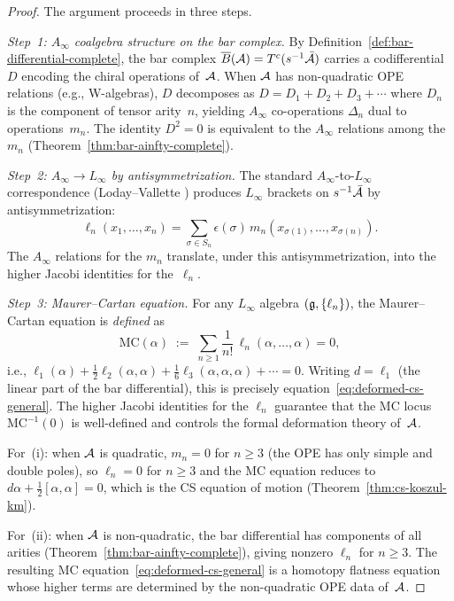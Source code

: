 \begin{proof}
The argument proceeds in three steps.

\emph{Step~1: $A_\infty$ coalgebra structure on the bar complex.}
By Definition~\ref{def:bar-differential-complete}, the bar
complex $\overline{B}(\mathcal{A}) = T^c(s^{-1}\bar{\mathcal{A}})$ carries a
codifferential $D$ encoding the chiral operations of~$\mathcal{A}$.
When $\mathcal{A}$ has non-quadratic OPE relations (e.g., W-algebras),
$D$ decomposes as $D = D_1 + D_2 + D_3 + \cdots$ where
$D_n$ is the component of tensor arity~$n$, yielding
$A_\infty$ co-operations $\Delta_n$ dual to operations~$m_n$.
The identity $D^2 = 0$ is equivalent to the $A_\infty$
relations among the~$m_n$
(Theorem~\ref{thm:bar-ainfty-complete}).

\emph{Step~2: $A_\infty \to L_\infty$ by antisymmetrization.}
The standard $A_\infty$-to-$L_\infty$ correspondence
(Loday--Vallette \cite[Thm.~10.1.13]{LV12}) produces
$L_\infty$ brackets on $s^{-1}\bar{\mathcal{A}}$ by
antisymmetrization:
\[
\ell_n(x_1, \ldots, x_n) = \sum_{\sigma \in S_n}
\epsilon(\sigma)\, m_n(x_{\sigma(1)}, \ldots,
x_{\sigma(n)}).
\]
The $A_\infty$ relations for the $m_n$ translate,
under this antisymmetrization, into the higher Jacobi
identities for the~$\ell_n$.

\emph{Step~3: Maurer--Cartan equation.}
For any $L_\infty$ algebra $(\mathfrak{g}, \{\ell_n\})$, the
Maurer--Cartan equation is \emph{defined} as
\[
\mathrm{MC}(\alpha) \;:=\;
\sum_{n \geq 1} \frac{1}{n!}\,
\ell_n(\alpha, \ldots, \alpha) = 0,
\]
i.e., $\ell_1(\alpha) + \frac{1}{2}\ell_2(\alpha,\alpha)
+ \frac{1}{6}\ell_3(\alpha,\alpha,\alpha) + \cdots = 0$.
Writing $d = \ell_1$ (the linear part of the bar
differential), this is precisely
equation~\eqref{eq:deformed-cs-general}.  The higher
Jacobi identities for the $\ell_n$ guarantee that the
MC locus $\mathrm{MC}^{-1}(0)$ is well-defined and
controls the formal deformation theory of~$\mathcal{A}$.

For~(i): when $\mathcal{A}$ is quadratic, $m_n = 0$ for $n \geq 3$
(the OPE has only simple and double poles), so $\ell_n = 0$
for $n \geq 3$ and the MC equation reduces to
$d\alpha + \frac{1}{2}[\alpha, \alpha] = 0$,
which is the CS equation of motion
(Theorem~\ref{thm:cs-koszul-km}).

For~(ii): when $\mathcal{A}$ is non-quadratic, the bar differential
has components of all arities (Theorem~\ref{thm:bar-ainfty-complete}),
giving nonzero $\ell_n$ for $n \geq 3$.
The resulting MC equation~\eqref{eq:deformed-cs-general} is
a homotopy flatness equation whose higher terms are determined
by the non-quadratic OPE data of~$\mathcal{A}$.
\end{proof}

